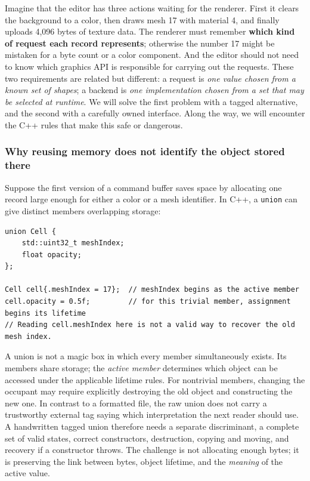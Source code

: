 Imagine that the editor has three actions waiting for the renderer. First it clears the background to a color, then draws mesh 17 with material 4, and finally uploads 4,096 bytes of texture data. The renderer must remember \textbf{which kind of request each record represents}; otherwise the number 17 might be mistaken for a byte count or a color component. And the editor should not need to know which graphics API is responsible for carrying out the requests. These two requirements are related but different: a request is \emph{one value chosen from a known set of shapes}; a backend is \emph{one implementation chosen from a set that may be selected at runtime}. We will solve the first problem with a tagged alternative, and the second with a carefully owned interface. Along the way, we will encounter the C++ rules that make this safe or dangerous.

\subsubsection{Why reusing memory does not identify the object stored there}\label{why-reusing-memory-does-not-identify-the-object-stored-there}

Suppose the first version of a command buffer saves space by allocating one record large enough for either a color or a mesh identifier. In C++, a \texttt{union} can give distinct members overlapping storage:

\begin{verbatim}
union Cell {
    std::uint32_t meshIndex;
    float opacity;
};

Cell cell{.meshIndex = 17};  // meshIndex begins as the active member
cell.opacity = 0.5f;         // for this trivial member, assignment begins its lifetime
// Reading cell.meshIndex here is not a valid way to recover the old mesh index.
\end{verbatim}

A union is not a magic box in which every member simultaneously exists. Its members share storage; the \emph{active member} determines which object can be accessed under the applicable lifetime rules. For nontrivial members, changing the occupant may require explicitly destroying the old object and constructing the new one. In contrast to a formatted file, the raw union does not carry a trustworthy external tag saying which interpretation the next reader should use. A handwritten tagged union therefore needs a separate discriminant, a complete set of valid states, correct constructors, destruction, copying and moving, and recovery if a constructor throws. The challenge is not allocating enough bytes; it is preserving the link between bytes, object lifetime, and the \emph{meaning} of the active value.

